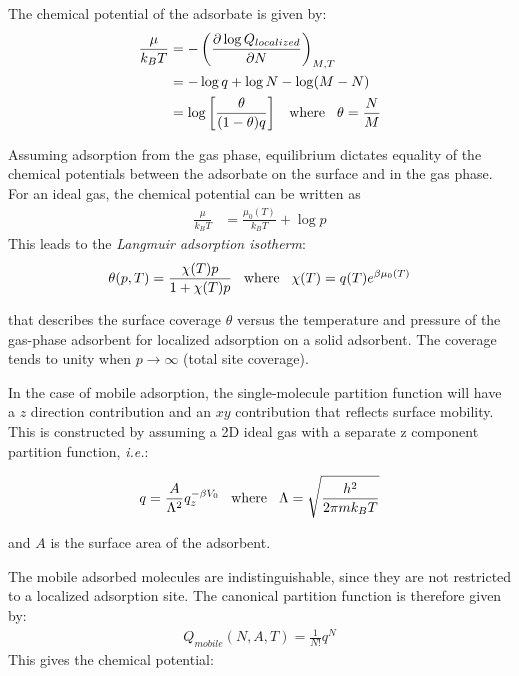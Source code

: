 \documentclass[book.tex]{subfiles}
\begin{document}
The chemical potential of the adsorbate is given by:
\begin{align}
\frac{\mu}{k_BT} &= -\left( \frac{\partial \log Q_{localized}}{\partial N}\right)_{M,T} \\
&= -\log q + \log N -\log(M-N) \\
&= \log \left[ \frac{\theta}{(1-\theta)q} \right] \hspace{0.3cm} \text{where} \hspace{0.3cm} \theta = \frac{N}{M}
\end{align}

Assuming adsorption from the gas phase, equilibrium dictates equality of the chemical potentials between the adsorbate on the surface and in the gas phase. For an ideal gas, the chemical potential can be written as 
\begin{align}
\frac{\mu}{k_BT} &= \frac{\mu_0(T)}{k_BT} + \log p
\end{align}
This leads to the \textit{Langmuir adsorption isotherm}:
\begin{align}\label{Eq4}
\theta(p,T) = \frac{\chi(T)p}{1+\chi(T)p} \hspace{0.3cm} \text{where} \hspace{0.3cm} \chi(T) = q(T)e^{\beta\mu_0(T)} 
\end{align}

\noindent that describes the surface coverage $\theta$ versus the temperature and pressure of the gas-phase adsorbent for localized adsorption on a solid adsorbent. The coverage tends to unity when $p \rightarrow \infty$ (total site coverage).

In the case of mobile adsorption, the single-molecule partition function will have a $z$ direction contribution and an $xy$ contribution that reflects surface mobility. This is constructed by assuming a 2D ideal gas with a separate z
component partition function, \textit{i.e.}:

\begin{align}\label{Eq5}
q = \frac{A}{\Lambda^2}q_z^{-\beta V_0} \hspace{0.3cm} \text{where} \hspace{0.3cm} \Lambda = \sqrt{\frac{h^2}{2\pi m k_BT}}
\end{align}

\noindent and $A$ is the surface area of the adsorbent.

The mobile adsorbed molecules are indistinguishable, since they are not restricted to a localized adsorption site. The canonical partition function is therefore given by:
\begin{align}\label{Eq6}
Q_{mobile}(N,A,T) = \frac{1}{N!}q^N
\end{align}
This gives the chemical potential:
\end{document}
